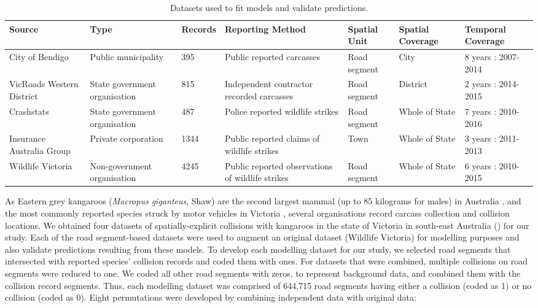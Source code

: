 \begin{table}[htp]
\caption{Datasets used to fit models and validate predictions.}
\begin{tabularx}{\textwidth}{YYYYYYY} \toprule
Source						&Type							&Records	&Reporting Method	&Spatial Unit	&Spatial Coverage	&Temporal Coverage \\ \midrule
City of Bendigo				&Public municipality			&395		&Public reported carcasses			&Road segment		&City	&8 years : 2007-2014 \\
VicRoads Western District	&State government organisation	&815		&Independent contractor recorded  carcasses			&Road segment		&District	&2 years : 2014-2015 \\
Crashstats					&State government organisation	&487		&Police reported wildlife strikes			&Road segment		&Whole of State	&7 years : 2010-2016 \\
Insurance Australia Group	&Private corporation			&1344		&Public reported claims of wildlife strikes			&Town		&Whole of State	&3 years : 2011-2013 \\
Wildlife Victoria			&Non-government organisation	&4245		&Public reported observations of wildlife strikes			&Road segment		&Whole of State	&6 years : 2010-2015 \\
\bottomrule
\end{tabularx}
\label{val_data}
\end{table}

As Eastern grey kangaroos (\textit{Macropus giganteus}, Shaw) are the second largest mammal (up to 85 kilograms for males) in Australia \citep{coul10}, and the most commonly reported species struck by motor vehicles in Victoria \citep{rowd08}, several organisations record carcass collection and collision locations. We obtained four datasets of spatially-explicit collisions with kangaroos in the state of Victoria in south-east Australia () for our study. Each of the road segment-based datasets were used to augment an original dataset (Wildlife Victoria) for modelling purposes and also validate predictions resulting from these models. To develop each modelling dataset for our study, we selected road segments that intersected with reported species’ collision records and coded them with ones. For datasets that were combined, multiple collisions on road segments were reduced to one. We coded all other road segments with zeros, to represent background data, and combined them with the collision record segments.  Thus, each modelling dataset was comprised of 644,715 road segments having either a collision (coded as 1) or no collision (coded as 0). Eight permutations were developed by combining independent data with original data:

